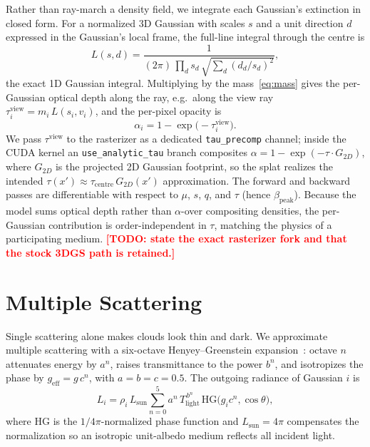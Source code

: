 \documentclass[sigconf]{acmart}
\newcommand{\bpeak}{\beta_{\mathrm{peak}}}
\newcommand{\Tlight}{T_{\mathrm{light}}}
\newcommand{\todo}[1]{\textcolor{red}{\textbf{[TODO: #1]}}}
\begin{document}
Rather than ray-march a density field, we integrate each Gaussian's extinction
in closed form. For a normalized 3D Gaussian with scales $s$ and a unit
direction $d$ expressed in the Gaussian's local frame, the full-line integral
through the centre is
\begin{equation}
  L(s,d) = \frac{1}{(2\pi)\,\prod_d s_d \,\sqrt{\sum_d (d_d/s_d)^2}},
  \label{eq:lineint}
\end{equation}
the exact 1D Gaussian integral. Multiplying by the mass~\eqref{eq:mass} gives
the per-Gaussian optical depth along the ray, e.g.\ along the view ray
$\tau^{\mathrm{view}}_i = m_i\,L(s_i, v_i)$, and the per-pixel opacity is
\begin{equation}
  \alpha_i = 1 - \exp\!\big(-\tau^{\mathrm{view}}_i\big).
\end{equation}
We pass $\tau^{\mathrm{view}}$ to the rasterizer as a dedicated
\texttt{tau\_precomp} channel; inside the CUDA kernel an
\texttt{use\_analytic\_tau} branch composites $\alpha = 1 - \exp(-\tau\cdot
G_{2D})$, where $G_{2D}$ is the projected 2D Gaussian footprint, so the
splat realizes the intended $\tau(x') \approx \tau_{\text{centre}}\,G_{2D}(x')$
approximation. The forward and backward passes are differentiable with respect
to $\mu$, $s$, $q$, and $\tau$ (hence $\bpeak$). Because the model sums optical
depth rather than $\alpha$-over compositing densities, the per-Gaussian
contribution is order-independent in $\tau$, matching the physics of a
participating medium. \todo{state the exact rasterizer fork and that the stock
3DGS path is retained.}

\section{Multiple Scattering}
\label{sec:ms}

Single scattering alone makes clouds look thin and dark. We approximate
multiple scattering with a six-octave Henyey--Greenstein
expansion~\cite{wrenninge2013oz}: octave $n$ attenuates energy by $a^n$, raises
transmittance to the power $b^n$, and isotropizes the phase by $g_{\text{eff}} =
g\,c^n$, with $a=b=c=0.5$. The outgoing radiance of Gaussian $i$ is
\begin{equation}
  L_i = \rho_i\, L_{\mathrm{sun}}
        \sum_{n=0}^{5} a^n\, \Tlight^{\,b^n}\,
        \mathrm{HG}\!\big(g_i c^n, \cos\theta\big),
\end{equation}
where $\mathrm{HG}$ is the $1/4\pi$-normalized phase function and $L_{\mathrm{sun}}
= 4\pi$ compensates the normalization so an isotropic unit-albedo medium
reflects all incident light.
\end{document}
